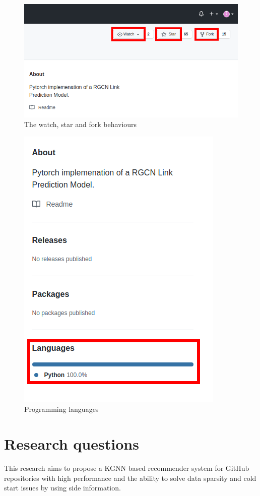 \documentclass[11pt,twoside]{report}
\begin{document}
\begin{figure}[H]
    \centering
    \includegraphics[scale=0.4]{watch_star_fork.png}
    \caption{The watch, star and fork behaviours}
    \label{fig:watch_star_fork}
\end{figure}

\begin{figure}[H]
    \centering
    \includegraphics[scale=0.4]{programming_languages.png}
    \caption{Programming languages}
    \label{fig:programming_languages}
\end{figure}

\section{Research questions}
This research aims to propose a KGNN based recommender system for GitHub repositories with high performance and the ability to solve data sparsity and cold start issues by using side information.
\end{document}
